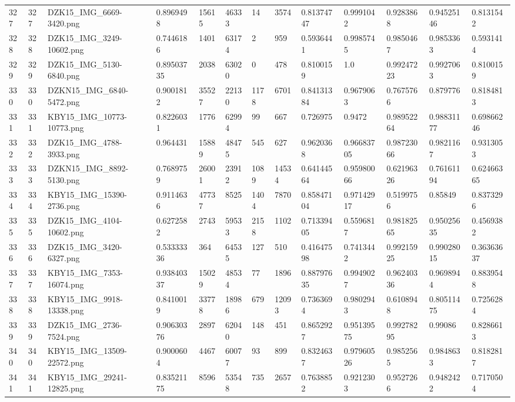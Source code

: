 \documentclass[11pt, a4paper, twoside]{report}
\begin{document}
\begin{longtable}[c]{@{}lllllllllllll@{}}
327 & 327 & DZK15\_IMG\_6669-3420.png & 0.8969498 & 15615 & 46333 & 14 & 3574 & 0.81374747 & 0.9991042 & 0.9283868 & 0.94525146 & 0.8131542 \\
328 & 328 & DZK15\_IMG\_3249-10602.png & 0.7446186 & 1401 & 63174 & 2 & 959 & 0.5936441 & 0.9985745 & 0.9850467 & 0.9853363 & 0.5931414 \\
329 & 329 & DZK15\_IMG\_5130-6840.png & 0.89503735 & 2038 & 63020 & 0 & 478 & 0.8100159 & 1.0 & 0.99247223 & 0.9927063 & 0.8100159 \\
330 & 330 & DZKN15\_IMG\_6840-5472.png & 0.9001812 & 35527 & 22130 & 1178 & 6701 & 0.84131384 & 0.9679063 & 0.7675766 & 0.879776 & 0.8184813 \\
331 & 331 & KBY15\_IMG\_10773-10773.png & 0.8226031 & 1776 & 62994 & 99 & 667 & 0.726975 & 0.9472 & 0.98952264 & 0.98831177 & 0.69866246 \\
332 & 332 & DZK15\_IMG\_4788-3933.png & 0.964431 & 15889 & 48475 & 545 & 627 & 0.9620368 & 0.96683705 & 0.98723066 & 0.9821167 & 0.9313053 \\
333 & 333 & DZKN15\_IMG\_8892-5130.png & 0.7689759 & 26001 & 23912 & 1089 & 14534 & 0.64144564 & 0.95980066 & 0.62196326 & 0.76161194 & 0.62466365 \\
334 & 334 & KBY15\_IMG\_15390-2736.png & 0.9114636 & 47737 & 8525 & 1404 & 7870 & 0.85847104 & 0.97142917 & 0.5199756 & 0.85849 & 0.8373296 \\
335 & 335 & DZK15\_IMG\_4104-10602.png & 0.6272582 & 2743 & 59533 & 2158 & 1102 & 0.71339405 & 0.5596817 & 0.98182565 & 0.95025635 & 0.4569382 \\
336 & 336 & DZK15\_IMG\_3420-6327.png & 0.53333336 & 364 & 64535 & 127 & 510 & 0.41647598 & 0.7413442 & 0.99215925 & 0.99028015 & 0.36363637 \\
337 & 337 & KBY15\_IMG\_7353-16074.png & 0.93840337 & 15029 & 48534 & 77 & 1896 & 0.88797635 & 0.9949027 & 0.96240336 & 0.9698944 & 0.8839548 \\
338 & 338 & KBY15\_IMG\_9918-13338.png & 0.8410019 & 33778 & 18986 & 679 & 12093 & 0.7363694 & 0.9802943 & 0.6108948 & 0.80511475 & 0.7256284 \\
339 & 339 & DZK15\_IMG\_2736-7524.png & 0.90630376 & 2897 & 62040 & 148 & 451 & 0.8652927 & 0.95139575 & 0.99278295 & 0.99086 & 0.8286613 \\
340 & 340 & KBY15\_IMG\_13509-22572.png & 0.9000604 & 4467 & 60077 & 93 & 899 & 0.8324637 & 0.97960526 & 0.9852565 & 0.9848633 & 0.8182817 \\
341 & 341 & KBY15\_IMG\_29241-12825.png & 0.83521175 & 8596 & 53548 & 735 & 2657 & 0.7638852 & 0.9212303 & 0.9527266 & 0.9482422 & 0.7170504 \\

\end{longtable}
\end{document}
